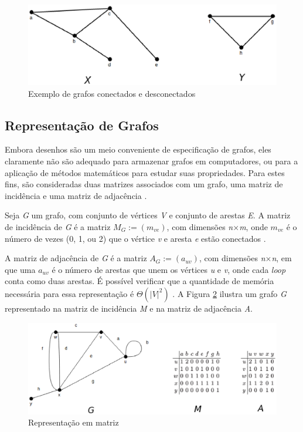 \begin{figure}[!h]
	\centering
	\includegraphics[scale=0.5]{figuras/capitulo2/desconectados.eps}
	\caption{Exemplo de grafos conectados e desconectados}
	\label{desconectados}
\end{figure}

\subsection{Representação de Grafos}

Embora desenhos são um meio conveniente de especificação de grafos, eles claramente não são adequado para armazenar grafos em computadores, ou para a aplicação de métodos matemáticos para estudar suas propriedades. Para estes fins, são consideradas duas matrizes associados com um grafo, uma matriz de incidência e uma matriz de adjacência \cite{Bondy:2007}.

Seja \textit{G} um grafo, com conjunto de vértices \textit{V} e conjunto de arestas \textit{E}. A matriz de incidência de \textit{G} é a matriz $M_G:= (m_{ve})$, com dimensões \textit{n$\times$m}, onde $m_{ve}$ é o número de vezes (0, 1, ou 2) que o vértice \textit{v} e aresta \textit{e} estão conectados \cite{Bondy:2007}.

A matriz de adjacência de \textit{G} é a matriz $A_G := (a_{uv})$, com dimensões \textit{n$\times$n}, em que uma $a_{uv}$ é o número de arestas que unem os vértices \textit{u} e \textit{v}, onde cada \textit{loop} conta como duas arestas. É possível verificar que a quantidade de memória necessária para essa representação é $\Theta(|\textit{V}|^2)$ \cite{Bondy:2007}. A Figura \ref{matriz} ilustra um grafo \textit{G} representado na matriz de incidência \textit{M} e na matriz de adjacência \textit{A}.

\begin{figure}[!h]
	\centering
	\includegraphics[scale=0.65]{figuras/capitulo2/matriz.eps}
	\caption{Representação em matriz}
	\label{matriz}
\end{figure}

